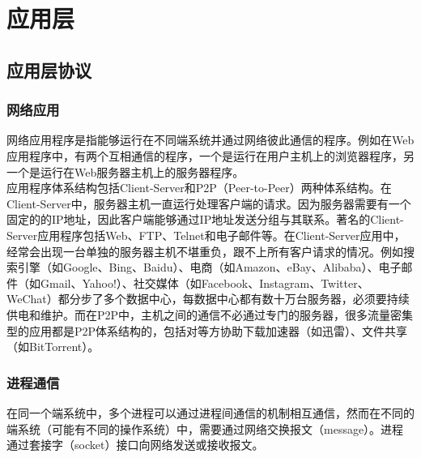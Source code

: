 \chapter{应用层}

\section{应用层协议}

\subsection{网络应用}

网络应用程序是指能够运行在不同端系统并通过网络彼此通信的程序。例如在Web应用程序中，有两个互相通信的程序，一个是运行在用户主机上的浏览器程序，另一个是运行在Web服务器主机上的服务器程序。\\

应用程序体系结构包括Client-Server和P2P（Peer-to-Peer）两种体系结构。在Client-Server中，服务器主机一直运行处理客户端的请求。因为服务器需要有一个固定的的IP地址，因此客户端能够通过IP地址发送分组与其联系。著名的Client-Server应用程序包括Web、FTP、Telnet和电子邮件等。在Client-Server应用中，经常会出现一台单独的服务器主机不堪重负，跟不上所有客户请求的情况。例如搜索引擎（如Google、Bing、Baidu）、电商（如Amazon、eBay、Alibaba）、电子邮件（如Gmail、Yahoo!）、社交媒体（如Facebook、Instagram、Twitter、WeChat）都分步了多个数据中心，每数据中心都有数十万台服务器，必须要持续供电和维护。而在P2P中，主机之间的通信不必通过专门的服务器，很多流量密集型的应用都是P2P体系结构的，包括对等方协助下载加速器（如迅雷）、文件共享（如BitTorrent）。\\

\subsection{进程通信}

在同一个端系统中，多个进程可以通过进程间通信的机制相互通信，然而在不同的端系统（可能有不同的操作系统）中，需要通过网络交换报文（message）。进程通过套接字（socket）接口向网络发送或接收报文。\\

